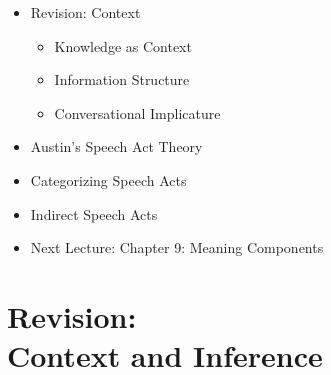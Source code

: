 \documentclass[headrule,footrule]{foils}
\begin{document}
\maketitle

%


\begin{itemize}\addtolength{\itemsep}{-1ex}
\item Revision: Context
  \begin{itemize}
  \item Knowledge as Context
  \item Information Structure
  \item Conversational Implicature
  \end{itemize}
\item Austin's Speech Act Theory
\item Categorizing Speech Acts
\item Indirect Speech Acts
\item Next Lecture: Chapter 9: Meaning Components
\end{itemize}

%


\section{Revision: \\ Context and Inference}




\end{document}
